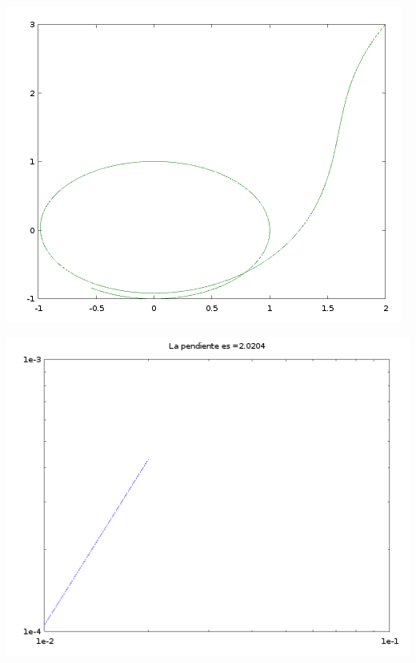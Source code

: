 \begin{center}
    \begin{minipage}{0.49\textwidth}
        \centering
        \includegraphics[width=\textwidth]{img/trapecio_grafica.png}
    \end{minipage}
    \begin{minipage}{.49\textwidth}
        \centering
        \includegraphics[width=\textwidth]{img/trapecio_pendiente.png}
    \end{minipage}
\end{center}